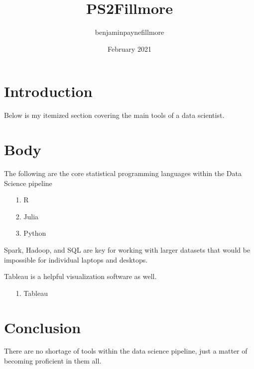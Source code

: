 \documentclass{article}
\title{PS2Fillmore}
\author{benjaminpaynefillmore }
\date{February 2021}
\begin{document}
\maketitle
\section{Introduction}
Below is my itemized section covering the main tools of a data scientist.

\section{Body}
The following are the core statistical programming languages within the Data Science pipeline
\begin{itemize}

    \item[1. R]
        \item[2. Julia]
            \item[3. Python]
\end{itemize}

Spark, Hadoop, and SQL are key for working with larger datasets that would be impossible for individual laptops and desktops. 

Tableau is a helpful visualization software as well.

\begin{itemize}
    \item [1. Tableau]
    

\end{itemize}


\section{Conclusion}
There are no shortage of tools within the data science pipeline, just a matter of becoming proficient in them all. 
\end{document}
